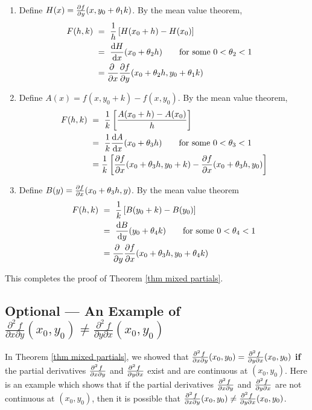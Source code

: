 \begin{enumerate}[(1)]
\item %
Define $H(x)=\pdiff{f}{y}(x,y_0+\theta_1k)$. By the mean value theorem,
\begin{align*}
F(h,k)\ &=\ \frac{1}{h}\left[H(x_0+h)-H(x_0)\right]\cr
&=\ \diff{H}{x}(x_0+\theta_2 h)
\qquad\text{for some $0<\theta_2<1$}\cr
&=\pdiff{}{x}
\pdiff{f}{y}(x_0+\theta_2 h,y_0+\theta_1k)
\end{align*}

\item %
Define $A(x)=f(x,y_0+k)-f(x,y_0)$. By the mean value theorem,
\begin{align*}
F(h,k)\ &=\ \frac{1}{k} \left[\frac{A(x_0+h)-A(x_0)}{h}\right] \\
&=\ \frac{1}{k}\diff{A}{x}(x_0+\theta_3 h)
\qquad\text{for some $0<\theta_3<1$} \\
&=\frac{1}{k}
\left[\pdiff{f}{x}(x_0+\theta_3h,y_0+k)
-\pdiff{f}{x}(x_0+\theta_3h,y_0)\right]
\end{align*}

\item %
Define $B(y)=\pdiff{f}{x}(x_0+\theta_3h,y)$. By the mean value theorem
\begin{align*}
F(h,k)\ &=\ \frac{1}{k}\left[B(y_0+k)-B(y_0)\right] \\
&=\ \diff{B}{y}(y_0+\theta_4 k)
\qquad\text{for some $0<\theta_4<1$} \\
&=\pdiff{}{y}
\pdiff{f}{x}(x_0+\theta_3 h,y_0+\theta_4k)
\end{align*}

\end{enumerate}
This completes the proof of Theorem \ref{thm mixed partials}.

\subsection{Optional --- An Example of 
$\frac{\partial^2\ f}{\partial x\partial y}(x_0,y_0)
\ne\frac{\partial^2\ f}{\partial y\partial x}(x_0,y_0)$}
\label{subsec mixed partials counterexample}

In Theorem \ref{thm mixed partials}, we showed that
$
\frac{\partial^2\hfil f\hfil\,}{\partial x\partial y}(x_0,y_0)
=\frac{\partial^2\hfil f\hfil\,}{\partial y\partial x}(x_0,y_0)
$
\textbf{if} the partial derivatives 
$\frac{\partial^2\hfil f\hfil\,}{\partial x\partial y}$ and 
$\frac{\partial^2\hfil f\hfil\,}{\partial y\partial x}$ exist 
and are continuous at $(x_0,y_0)$. Here is an example which shows that
if the partial derivatives 
$\frac{\partial^2\hfil f\hfil\,}{\partial x\partial y}$ and 
$\frac{\partial^2\hfil f\hfil\,}{\partial y\partial x}$ 
are not continuous at $(x_0,y_0)$, then it is possible that 
$
\frac{\partial^2\hfil f\hfil\,}{\partial x\partial y}(x_0,y_0)
\ne\frac{\partial^2\hfil f\hfil\,}{\partial y\partial x}(x_0,y_0)$.

